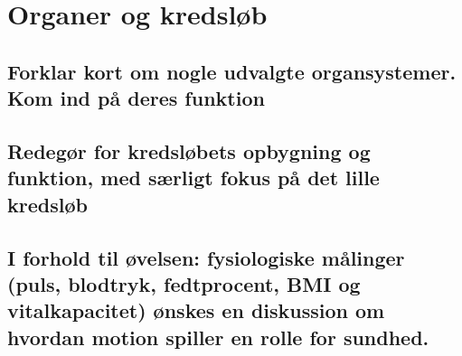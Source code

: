 \newpage
\section{Organer og kredsløb}
\subsection{Forklar kort om nogle udvalgte organsystemer. Kom ind på deres funktion}
\subsection{Redegør for kredsløbets opbygning og funktion, med særligt fokus på det lille kredsløb}
\subsection{I forhold til øvelsen: fysiologiske målinger (puls, blodtryk, fedtprocent, BMI og vitalkapacitet) ønskes en diskussion om hvordan motion spiller en rolle for sundhed.}